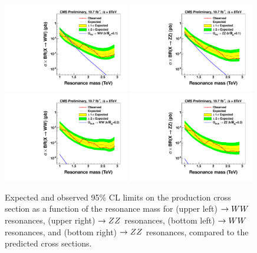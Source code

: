 \begin{figure}[h!tb]
\centering
\includegraphics[width=0.49\textwidth]{EXO-12-024/figs/limits/brazilianFlag_RS1WW_combined.pdf}
\includegraphics[width=0.49\textwidth]{EXO-12-024/figs/limits/brazilianFlag_RS1ZZ_combined.pdf}
\includegraphics[width=0.49\textwidth]{EXO-12-024/figs/limits/brazilianFlag_BulkWW_combined.pdf}
\includegraphics[width=0.49\textwidth]{EXO-12-024/figs/limits/brazilianFlag_BulkZZ_combined.pdf}
 \caption{Expected and observed 95\% CL limits on the production cross section
  as a function of the resonance mass for (upper left) \GRS$\to W W$ resonances,
  (upper right) \GRS$\to Z Z$ resonances, (bottom left) \GBulk$\to W W$ resonances, and
  (bottom right) \GBulk $\to Z Z$ resonances, compared to the predicted cross sections.
  \label{fig:Vtagresults2}}
\end{figure}


